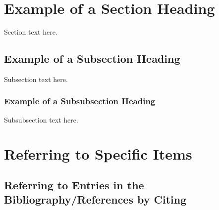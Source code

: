 		








 

















\section{Example of a Section Heading}
Section text here. 

\subsection{Example of a Subsection Heading}
Subsection text here. 

\subsubsection{Example of a Subsubsection Heading}
Subsubsection text here. 





\section{Referring to Specific Items}

\subsection{Referring to Entries in the Bibliography/References by Citing}

